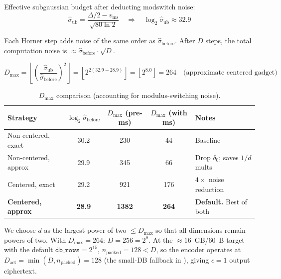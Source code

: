 \documentclass[11pt,a4paper]{article}
\newcommand{\floor}[1]{\left\lfloor #1 \right\rfloor}
\begin{document}
Effective subgaussian budget after deducting modswitch noise:
\begin{equation}
    \hat{\sigma}_{\mathrm{ub}} = \frac{\Delta/2 - v_{\mathrm{ms}}}{\sqrt{80 \ln 2}}
    \quad\Longrightarrow\quad
    \log_2 \hat{\sigma}_{\mathrm{ub}} \approx 32.9
    \label{eq:sigma-ub}
\end{equation}

Each Horner step adds noise of the same order as $\hat{\sigma}_{\mathrm{before}}$.
After $D$ steps, the total computation noise is $\approx \hat{\sigma}_{\mathrm{before}} \cdot \sqrt{D}$.

\begin{equation}
    \boxed{D_{\max} = \floor{\left(\frac{\hat{\sigma}_{\mathrm{ub}}}{\hat{\sigma}_{\mathrm{before}}}\right)^2} = \floor{2^{2(32.9 - 28.9)}} = \floor{2^{8.0}} = 264 \quad \text{(approximate centered gadget)}}
    \label{eq:dmax}
\end{equation}

\begin{table}[ht]\centering
\caption{$D_{\max}$ comparison (accounting for modulus-switching noise).}
\label{tab:dmax}
\begin{tabular}{@{}lcccl@{}}
\toprule
\textbf{Strategy} & $\log_2 \hat{\sigma}_{\mathrm{before}}$ & $D_{\max}$ (pre-ms) & $D_{\max}$ (with ms) & \textbf{Notes} \\
\midrule
Non-centered, exact              & 30.2 & 230 &  44 & Baseline \\
Non-centered, approx             & 29.9 & 345 &  66 & Drop $\delta_0$; saves $1/d$ mults \\
Centered, exact                  & 29.2 & 921 & 176 & $4\times$ noise reduction \\
\textbf{Centered, approx}       & \textbf{28.9} & \textbf{1382} & \textbf{264} & \textbf{Default.} Best of both \\
\bottomrule
\end{tabular}
\end{table}

We choose $d$ as the largest power of two $\le D_{\max}$ so that all dimensions remain powers of two.
With $D_{\max} = 264$: $D = 256 = 2^8$.
At the $\approx\!16$~GB/60~B target with the default $\texttt{db\_rows} = 2^{15}$, $n_{\mathrm{packed}} = 128 < D$, so the encoder operates at $D_{\mathrm{act}} = \min(D, n_{\mathrm{packed}}) = 128$ (the small-DB fallback in ), giving $c = 1$ output ciphertext.

\end{document}
